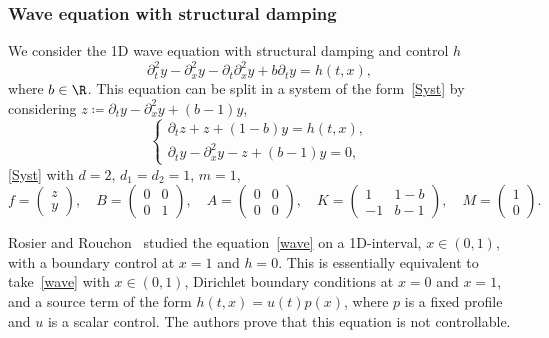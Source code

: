 \subsubsection{Wave equation with structural damping}
We consider the 1D wave equation with structural damping and control $h$\vspace*{-3pt}\enlargethispage{\baselineskip}%
\begin{equation} \label{wave}
\partial_t^2 y - \partial_x^2 y -\partial_t\partial_x^2y + b \partial_t y = h(t,x),
\end{equation}
where $b\in\R$. This equation can be split in a system of the form~\eqref{Syst} by considering $z\coloneqq \partial_t y - \partial_x^2 y+(b-1)y$,\vspace*{-3pt}
\begin{equation} \label{wave_syst}
\begin{cases}
\partial_t z+z+(1-b)y= h(t,x), \\
\partial_t y-\partial_x^2 y -z + (b-1)y =0,
\end{cases}
\end{equation}
\ie \eqref{Syst} with $d=2$, $d_1=d_2=1$, $m=1$,\vspace*{-3pt}
\begin{equation} \label{wave_matrix}
f=\begin{pmatrix}
z \\ y
\end{pmatrix}, \quad
B=\begin{pmatrix}
0 & 0 \\ 0 & 1
\end{pmatrix}, \quad
A=\begin{pmatrix}
0 & 0 \\ 0 & 0
\end{pmatrix}, \quad
K=\begin{pmatrix}
1 & 1-b \\ -1 & b-1
\end{pmatrix}, \quad
M=\begin{pmatrix}
1 \\ 0
\end{pmatrix}.
\end{equation}

Rosier and Rouchon~\cite{rosier_2007} studied the equation~\eqref{wave} on a 1D-interval, $x\in (0,1)$, with a boundary control at $x=1$ and $h=0$. This is essentially equivalent to take~\eqref{wave} with $x\in(0,1)$, Dirichlet boundary conditions at $x=0$ and $x=1$, and a source term of the form $h(t,x)=u(t)p(x)$, where $p$ is a fixed profile and $u$ is a scalar control. The authors prove that this equation is not controllable.

